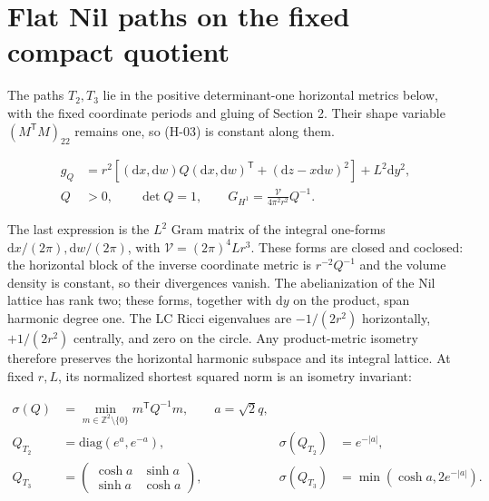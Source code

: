 \section{Flat Nil paths on the fixed compact quotient}
\label{app:nilquotient}

The paths $T_2,T_3$ lie in the positive determinant-one horizontal metrics
below, with the fixed coordinate periods and gluing of Section 2. Their shape
variable $(M^{\mathsf T}M)_{22}$ remains one, so (H-03) is constant along them.

\begin{equation}\tag{N-01}\label{eq:N-01}
\begin{aligned}
g_Q&=r^2\left[(\mathrm{d}x,\mathrm{d}w)Q(\mathrm{d}x,\mathrm{d}w)^{\mathsf T}
+(\mathrm{d}z-x\mathrm{d}w)^2\right]+L^2\mathrm{d}y^2,\\
Q&>0,\qquad\det Q=1,\qquad
G_{H^1}=\frac{\mathcal V}{4\pi^2r^2}Q^{-1}.
\end{aligned}
\end{equation}

The last expression is the $L^2$ Gram matrix of the integral one-forms
$\mathrm{d}x/(2\pi),\mathrm{d}w/(2\pi)$, with $\mathcal V=(2\pi)^4Lr^3$.
These forms are closed and coclosed: the horizontal block of the inverse
coordinate metric is $r^{-2}Q^{-1}$ and the volume density is constant, so
their divergences vanish. The abelianization of the Nil lattice has rank two;
these forms, together with $\mathrm{d}y$ on the product, span harmonic degree one.
The LC Ricci eigenvalues are $-1/(2r^2)$ horizontally, $+1/(2r^2)$ centrally,
and zero on the circle. Any product-metric isometry therefore preserves the
horizontal harmonic subspace and its integral lattice. At fixed $r,L$, its
normalized shortest squared norm is an isometry invariant:

\begin{equation}\tag{N-02}\label{eq:N-02}
\begin{aligned}
\sigma(Q)&=\min_{m\in\mathbb Z^2\setminus\{0\}}m^{\mathsf T}Q^{-1}m,
\qquad a=\sqrt2q,\\
Q_{T_2}&=\mathrm{diag}(e^a,e^{-a}),
&\sigma(Q_{T_2})&=e^{-|a|},\\
Q_{T_3}&=\begin{pmatrix}\cosh a&\sinh a\\\sinh a&\cosh a\end{pmatrix},
&\sigma(Q_{T_3})&=\min(\cosh a,2e^{-|a|}).
\end{aligned}
\end{equation}

